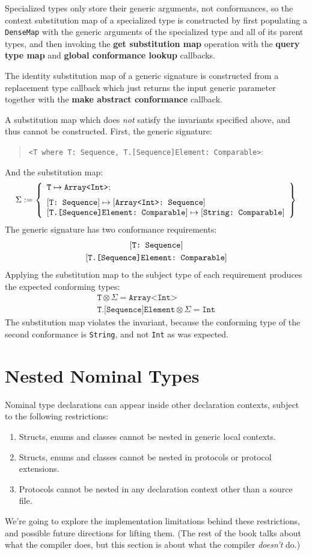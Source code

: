 \documentclass[../generics]{subfiles}
\begin{document}
Specialized types only store their generic arguments, not conformances, so the context substitution map of a specialized type is constructed by first populating a \texttt{DenseMap} with the generic arguments of the specialized type and all of its parent types, and then invoking the \textbf{get substitution map} operation with the \textbf{query type map} and \textbf{global conformance lookup} callbacks.

The identity substitution map of a generic signature is constructed from a replacement type callback which just returns the input generic parameter together with the \textbf{make abstract conformance} callback.

\begin{example}
A substitution map which does \emph{not} satisfy the invariants specified above, and thus cannot be constructed. First, the generic signature:
\begin{quote}
\texttt{<T where T:\ Sequence, T.[Sequence]Element:\ Comparable>}:
\end{quote}
And the substitution map:
\[
\Sigma := \InvalidSubjectTypeSubMap
\]
The generic signature has two conformance requirements:
\begin{gather*}
\ConfReq{T}{Sequence}\\
\ConfReq{T.[Sequence]Element}{Comparable}
\end{gather*}
Applying the substitution map to the subject type of each requirement produces the expected conforming types:
\begin{gather*}
\texttt{T} \otimes \Sigma = \texttt{Array<Int>}\\
\texttt{T.[Sequence]Element} \otimes \Sigma = \texttt{Int}
\end{gather*}
The substitution map violates the invariant, because the conforming type of the second conformance is \texttt{String}, and not \texttt{Int} as was expected.
\end{example}

\section{Nested Nominal Types}\label{nested nominal types}

Nominal type declarations can appear inside other declaration contexts, subject to the following restrictions:
\begin{enumerate}
\item Structs, enums and classes cannot be nested in generic local contexts.
\item Structs, enums and classes cannot be nested in protocols or protocol extensions.
\item Protocols cannot be nested in any declaration context other than a source file.
\end{enumerate}
We're going to explore the implementation limitations behind these restrictions, and possible future directions for lifting them. (The rest of the book talks about what the compiler does, but this section is about what the compiler \emph{doesn't} do.)
\end{document}
